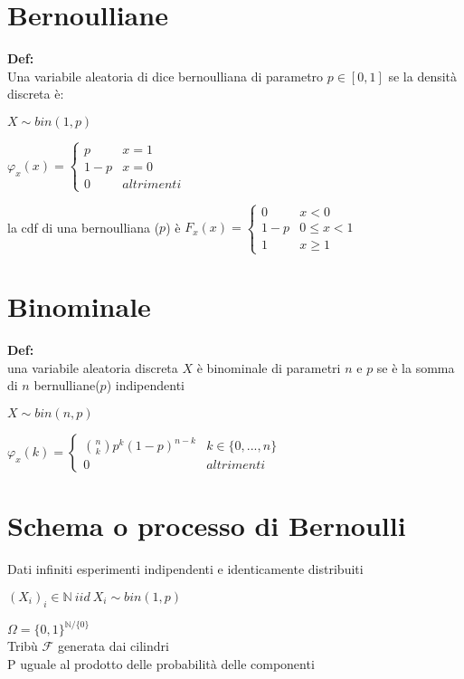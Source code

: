 \documentclass[11pt, letterpaper]{article}
\begin{document}
\section{Bernoulliane}
\textbf{Def:}\\ Una variabile aleatoria di dice bernoulliana di parametro $p\in[0,1]$ se la densità discreta è:
\begin{center}
    $X\sim bin(1,p)$

    $\varphi_{x}(x)=\begin{cases}            
        p & x=1\\
        1-p & x=0\\
        0 & altrimenti
        
    \end{cases}$
\end{center}
la cdf di una bernoulliana ($p$) è 
$F_{x}(x)=
\begin{cases}
        0 & x < 0\\
        1-p & 0 \leq x<1\\
        1 & x\geq 1
\end{cases}$

\section{Binominale}
\textbf{Def:}\\ una variabile aleatoria discreta $X$ è binominale di parametri $n$ e $p$ se è la somma di $n$ bernulliane($p$) 
indipendenti
\begin{center}
    $X\sim bin(n,p)$

    $\varphi_{x}(k)=
    \begin{cases}
            \binom{n}{k}p^{k}(1-p)^{n-k} & k\in\{0,...,n\}\\
            0 & altrimenti
        
    \end{cases}$
\end{center}

\newpage
\thispagestyle{fancy}
\section{Schema o processo di Bernoulli}

Dati infiniti esperimenti indipendenti e identicamente distribuiti
\begin{center}
    $(X_{i})_{i}\in\mathbb{N}\ iid\ X_{i}\sim bin(1,p)$
\end{center}
$\Omega=\{0,1\}^{\mathbb{N}/\{0\}}$\\
Tribù $\mathcal{F}$ generata dai cilindri\\
P uguale al prodotto delle probabilità delle componenti
\end{document}
